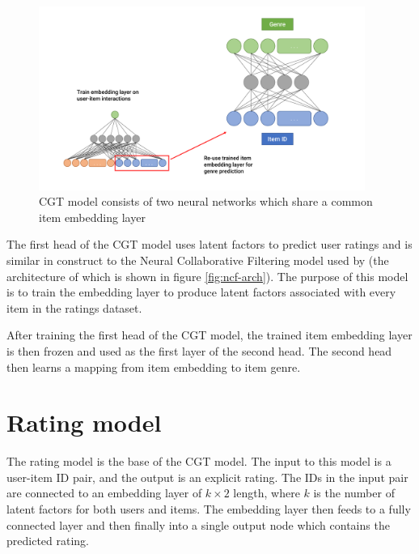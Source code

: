 \begin{figure}[H]
\centering
\includegraphics[width=0.95\textwidth]{Figures/4_CGT-model.pdf}
\decoRule
\caption[CGT architecture]{CGT model consists of two neural networks which share a common item embedding layer}
\label{fig:4_CGT-architecture}
\end{figure}

The first head of the CGT model uses latent factors to predict user ratings and is similar in construct to the Neural Collaborative Filtering model used by \citeauthor{he2017neural} (the architecture of which is shown in figure \ref{fig:ncf-arch}). The purpose of this model is to train the embedding layer to produce latent factors associated with every item in the ratings dataset.

After training the first head of the CGT model, the trained item embedding layer is then frozen and used as the first layer of the second head. The second head then learns a mapping from item embedding to item genre.

\section{Rating model}
\label{section:rating-model}
The rating model is the base of the CGT model. The input to this model is a user-item ID pair, and the output is an explicit rating. The IDs in the input pair are connected to an embedding layer of $k\times2$ length, where $k$ is the number of latent factors for both users and items. The embedding layer then feeds to a fully connected layer and then finally into a single output node which contains the predicted rating.


